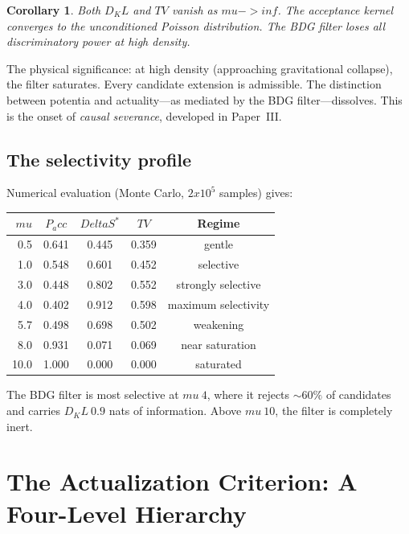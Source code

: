 \documentclass[11pt]{article}
\def\Delta{Delta}%
\def\mu{mu}%
\def\mathrm#1{#1}%
\def\times{x}%
\def\approx{~}%
\def\to{->}%
\def\infty{inf}%
\def\Pacc{P_acc}%
\def\Dkl{D_KL}%
\def\TV{TV}%
\newtheorem{corollary}{Corollary}
\newcommand{\Pacc}{P_{\mathrm{acc}}}
\newcommand{\Dkl}{D_{\mathrm{KL}}}
\newcommand{\TV}{\mathrm{TV}}
\begin{document}
\begin{corollary}
Both $\Dkl$ and $\TV$ vanish as $\mu\to\infty$. The acceptance kernel converges to the unconditioned Poisson distribution. The BDG filter loses all discriminatory power at high density.
\end{corollary}

The physical significance: at high density (approaching gravitational collapse), the filter saturates. Every candidate extension is admissible. The distinction between potentia and actuality---as mediated by the BDG filter---dissolves. This is the onset of \emph{causal severance}, developed in Paper~III.

\subsection{The selectivity profile}

Numerical evaluation (Monte Carlo, $2\times 10^5$ samples) gives:

\begin{center}
\begin{tabular}{rcccc}
\toprule
$\mu$ & $\Pacc$ & $\Delta S^*$ & $\TV$ & Regime \\
\midrule
0.5 & 0.641 & 0.445 & 0.359 & gentle \\
1.0 & 0.548 & 0.601 & 0.452 & selective \\
3.0 & 0.448 & 0.802 & 0.552 & strongly selective \\
4.0 & 0.402 & 0.912 & 0.598 & maximum selectivity \\
5.7 & 0.498 & 0.698 & 0.502 & weakening \\
8.0 & 0.931 & 0.071 & 0.069 & near saturation \\
10.0 & 1.000 & 0.000 & 0.000 & saturated \\
\bottomrule
\end{tabular}
\end{center}

The BDG filter is most selective at $\mu\approx 4$, where it rejects $\sim 60\%$ of candidates and carries $\Dkl\approx 0.9$ nats of information. Above $\mu\approx 10$, the filter is completely inert.

\section{The Actualization Criterion: A Four-Level Hierarchy}
\label{sec:criterion}
\end{document}
